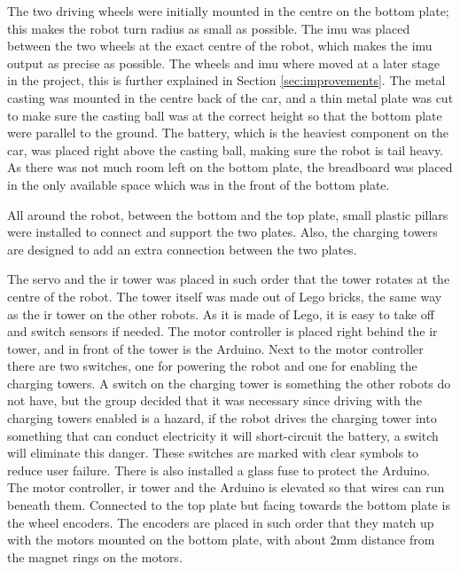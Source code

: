 The two driving wheels were initially mounted in the centre on the bottom plate; this makes the robot turn radius as small as possible. The \acrshort{imu} was placed between the two wheels at the exact centre of the robot, which makes the \acrshort{imu} output as precise as possible. The wheels and \acrshort{imu} where moved at a later stage in the project, this is further explained in Section \ref{sec:improvements}. The metal casting was mounted in the centre back of the car, and a thin metal plate was cut to make sure the casting ball was at the correct height so that the bottom plate were parallel to the ground. The battery, which is the heaviest component on the car, was placed right above the casting ball, making sure the robot is tail heavy. As there was not much room left on the bottom plate, the breadboard was placed in the only available space which was in the front of the bottom plate.

All around the robot, between the bottom and the top plate, small plastic pillars were installed to connect and support the two plates. Also, the charging towers are designed to add an extra connection between the two plates.

The servo and the \acrshort{ir} tower was placed in such order that the tower rotates at the centre of the robot. The tower itself was made out of Lego bricks, the same way as the \acrshort{ir} tower on the other robots. As it is made of Lego, it is easy to take off and switch sensors if needed. The motor controller is placed right behind the \acrshort{ir} tower, and in front of the tower is the Arduino. Next to the motor controller there are two switches, one for powering the robot and one for enabling the charging towers. A switch on the charging tower is something the other robots do not have, but the group decided that it was necessary since driving with the charging towers enabled is a hazard, if the robot drives the charging tower into something that can conduct electricity it will short-circuit the battery, a switch will eliminate this danger. These switches are marked with clear symbols to reduce user failure. There is also installed a glass fuse to protect the Arduino. The motor controller, \acrshort{ir} tower and the Arduino is elevated so that wires can run beneath them. Connected to the top plate but facing towards the bottom plate is the wheel encoders. The encoders are placed in such order that they match up with the motors mounted on the bottom plate, with about 2mm distance from the magnet rings on the motors.

